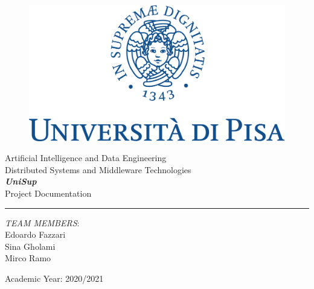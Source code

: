 \documentclass[11pt]{article}
\begin{document}
\begin{titlepage}
    \begin{center}
        \begin{figure}
            \includegraphics[width=\textwidth]{img/marchio_unipi_pant541-eps-converted-to.pdf}         
        \end{figure}
        {\Large
        Artificial Intelligence and Data Engineering\\
        \vspace{5mm} %
        Distributed Systems and Middleware Technologies}\\
        \vspace{30mm} %
        {\Huge\textbf{\textit{UniSup}}}\\
        \vspace{10mm} %
        {\Large Project Documentation}\\
        \par\noindent\rule{\textwidth}{0.4pt}
            \begin{flushright}
                \textit{TEAM MEMBERS}:\\
                Edoardo Fazzari\\ 
                Sina Gholami\\ 
                Mirco Ramo\\
        	
            \end{flushright}
            \vfill
        Academic Year: 2020/2021\\        
    \end{center}
\end{titlepage} 
   
\tableofcontents




%
\end{document}
